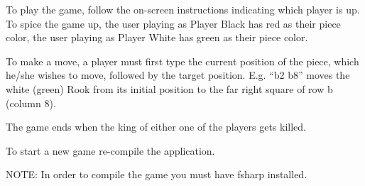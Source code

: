 \documentclass[a4paper]{report}
\begin{document}
To play the game, follow the on-screen instructions indicating which player is up. To spice the game up, the user playing as Player Black has red as their piece color, the user playing as Player White has green as their piece color.

To make a move, a player must first type the current position of the piece, which he/she wishes to move, followed by the target position. E.g. “b2 b8” moves the white (green) Rook from its initial position to the far right square of row b (column 8).

The game ends when the king of either one of the players gets killed.

To start a new game re-compile the application.

NOTE: In order to compile the game you must have fsharp installed.
\end{document}
